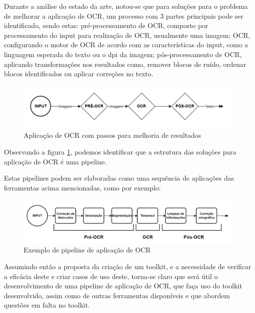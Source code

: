 Durante a análise do estado da arte, notou-se que para soluções para o problema de melhorar a aplicação de OCR, um processo com 3 partes principais pode ser identificado, sendo estas: pré-processamento de OCR, composto por processamento do input para realização de OCR, usualmente uma imagem; OCR, configurando o motor de OCR de acordo com as características do input, como a linguagem esperada do texto ou o dpi da imagem; pós-processamento de OCR, aplicando transformações nos resultados como, remover blocos de ruído, ordenar blocos identificados ou aplicar correções no texto. 

\begin{figure}[H]
     \centering
     \includegraphics[width=1\textwidth]{images/diagramas/pipeline_alto_nivel.png}
     \caption{Aplicação de OCR com passos para melhoria de resultados}
     \label{fig:pipeline_high_level}
\end{figure}
 
Observando a figura \ref{fig:pipeline_high_level}, podemos identificar que a estrutura das soluções para aplicação de OCR é uma pipeline.

Estas pipelines podem ser elaboradas como uma sequência de aplicações das ferramentas acima mencionadas, como por exemplo:

\begin{figure}[H]
	\centering
	\includegraphics[width=1\textwidth]{images/diagramas/pipeline_exemplo.png}
	\caption{Exemplo de pipeline de aplicação de OCR}
	\label{fig:pipeline_example}
\end{figure}
 
 
Assumindo então a proposta da criação de um toolkit, e a necessidade de verificar a eficácia deste e criar casos de uso deste, torna-se claro que será útil o desenvolvimento de uma pipeline de aplicação de OCR, que faça uso do toolkit desenvolvido, assim como de outras ferramentas disponíveis e que abordem questões em falta no toolkit.

